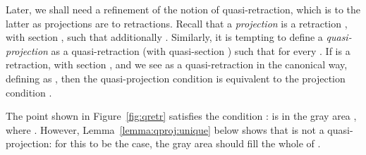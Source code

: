 \documentclass{LMCS}
\begin{document}
Later, we shall need a refinement of the notion of quasi-retraction,
which is to the latter as projections are to retractions.  Recall that
a {\em projection\/} is a retraction , with section ,
such that additionally .  Similarly, it is
tempting to define a \emph{quasi-projection} as a quasi-retraction
(with quasi-section ) such that  for every .  If  is a retraction, with section , and we see  as a
quasi-retraction in the canonical way, defining  as , then the quasi-projection condition  is
equivalent to the projection condition .



The point  shown in Figure~\ref{fig:qretr} satisfies the condition
:  is in the gray area , where .  However, Lemma~\ref{lemma:qproj:unique} below shows that  is
not a quasi-projection: for this to be the case, the gray area  should fill the whole of .
\end{document}
